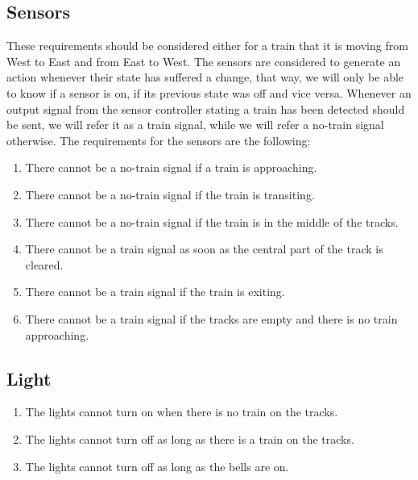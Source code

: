 \documentclass[final]{report}
\begin{document}
\subsection{Sensors}
These requirements should be considered either for a train that it is moving from West to East and from East to West.
The sensors are considered to generate an action whenever their state has suffered a change, that way, we will only be able to know if a sensor is on, if its previous state was off and vice versa.
Whenever an output signal from the sensor controller stating a train has been detected should be sent, we will refer it as a train signal, while we will refer a no-train signal otherwise.
The requirements for the sensors are the following:
	\begin{enumerate}
		\item There cannot be a no-train signal if a train is approaching.
		\item There cannot be a no-train signal if the train is transiting.
		\item There cannot be a no-train signal if the train is in the middle of the tracks.
		\item There cannot be a train signal as soon as the central part of the track is cleared.
		\item There cannot be a train signal if the train is exiting.
		\item There cannot be a train signal if the tracks are empty and there is no train approaching.
	\end{enumerate}

\subsection{Light}
	\begin{enumerate}
		\item The lights cannot turn on when there is no train on the tracks.
		\item The lights cannot turn off as long as there is a train on the tracks.
		\item The lights cannot turn off as long as the bells are on.
	\end{enumerate}
\end{document}
